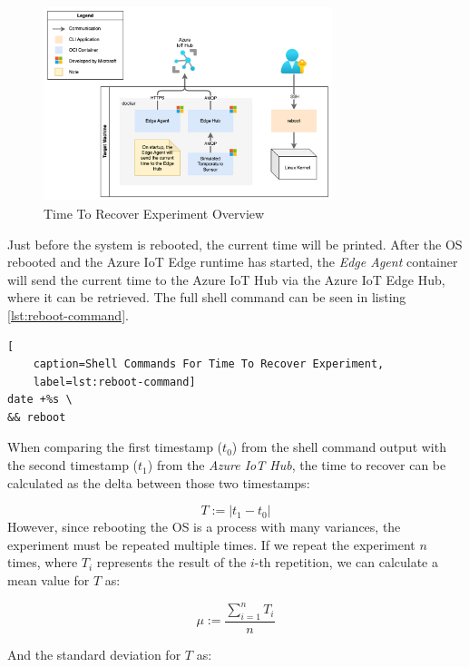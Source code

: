 \begin{figure}[H]
    \centering
    \includegraphics[width=0.75\textwidth]{fig/reboot-setup.drawio.png}
    \caption{Time To Recover Experiment Overview}
\end{figure}

\noindent
Just before the system is rebooted, the current time will be printed.
After the \ac{OS} rebooted and the Azure IoT Edge runtime has started, the
\textit{Edge Agent} container will send the current time to the Azure IoT Hub via
the Azure IoT Edge Hub, where it can be retrieved. The full shell command can
be seen in listing \ref{lst:reboot-command}.
\\

\begin{lstlisting}[
    caption=Shell Commands For Time To Recover Experiment,
    label=lst:reboot-command]
date +%s \
&& reboot
\end{lstlisting}

\noindent
When comparing the first timestamp ($t_0$) from the shell command output with the second
timestamp ($t_1$) from the \textit{Azure IoT Hub}, the time to recover can be calculated
as the delta between those two timestamps:

\begin{equation}
    T := |t_1 - t_0|
\end{equation}
However, since rebooting the \ac{OS} is a process with many variances, the experiment
must be repeated multiple times. If we repeat the experiment $n$ times, where
$T_i$ represents the result of the $i$-th repetition, we can calculate
a mean value for $T$ as:

\begin{equation}
    \mu := \frac{\sum_{i=1}^{n}T_i}{n}
\end{equation}

\noindent
And the standard deviation for $T$ as:

